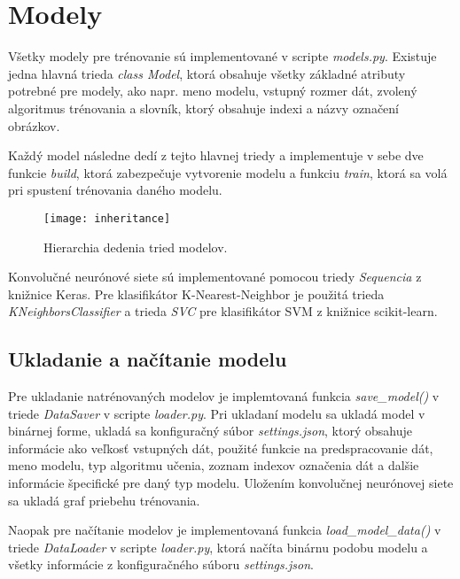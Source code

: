 
\section{Modely}
\label{sec:modely}
Všetky modely pre trénovanie sú implementované v scripte \textit{models.py}.
Existuje jedna hlavná trieda \textit{class Model}, ktorá obsahuje všetky základné atributy potrebné pre modely, ako napr.
    meno modelu, vstupný rozmer dát, zvolený algoritmus trénovania a slovník, ktorý obsahuje indexi a názvy označení obrázkov.

Každý model následne dedí z tejto hlavnej triedy a implementuje v sebe dve funkcie \textit{build}, ktorá zabezpečuje vytvorenie modelu a
    funkciu \textit{train}, ktorá sa volá pri spustení trénovania daného modelu.

\begin{figure}[H]
    \centering
    \texttt{[image: inheritance]}
    \caption{Hierarchia dedenia tried modelov.}
    \label{pic:inheritance}
\end{figure}

Konvolučné neurónové siete sú implementované pomocou triedy \textit{Sequencia} z knižnice Keras.
Pre klasifikátor K-Nearest-Neighbor je použitá trieda \textit{KNeighborsClassifier} a trieda \textit{SVC} pre klasifikátor SVM z knižnice scikit-learn.


\subsection{Ukladanie a načítanie modelu}
\label{subsec:ukladaniemodelu}
Pre ukladanie natrénovaných modelov je implemtovaná funkcia \textit{save\_model()} v triede \textit{DataSaver} v scripte \textit{loader.py}.
Pri ukladaní modelu sa ukladá model v binárnej forme, ukladá sa konfiguračný súbor \textit{settings.json}, ktorý obsahuje informácie ako veľkosť
    vstupných dát, použité funkcie na predspracovanie dát, meno modelu, typ algoritmu učenia, zoznam indexov označenia dát a dalšie informácie
    špecifické pre daný typ modelu.
Uložením konvolučnej neurónovej siete sa ukladá graf priebehu trénovania.

Naopak pre načítanie modelov je implementovaná funkcia \textit{load\_model\_data()} v triede \textit{DataLoader} v scripte \textit{loader.py},
    ktorá načíta binárnu podobu modelu a všetky informácie z konfiguračného súboru \textit{settings.json}.

